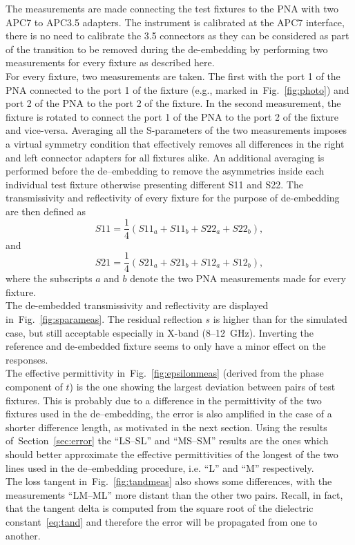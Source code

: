 \documentclass[11pt,a4paper]{article}
\newcommand{\sref}[1]{Section~\ref{#1}}
\newcommand{\fig}[1]{Fig.~\ref{#1}}
\newcommand{\laser}[1]{``#1''}
\begin{document}
    The measurements are made connecting the test fixtures to the PNA with two APC7 to APC3.5 adapters.
    The instrument is calibrated at the APC7 interface, there is no need to calibrate the 3.5 connectors as they can be
    considered as part of the transition to be removed during the de-embedding by performing two measurements for every
    fixture as described here.\\
    For every fixture, two measurements are taken.
    The first with the port 1 of the PNA connected to the port 1 of the fixture (e.g., marked in~\fig{fig:photo}) and
    port 2 of the PNA to the port 2 of the fixture.
    In the second measurement, the fixture is rotated to connect the port 1 of the PNA to the port 2 of the fixture and
    vice-versa.
    Averaging all the S-parameters of the two measurements imposes a virtual symmetry condition that effectively removes
    all differences in the right and left connector adapters for all fixtures alike.
    An additional averaging is performed before the de--embedding to remove the asymmetries inside each individual test
    fixture otherwise presenting different S11 and S22.
    The transmissivity and reflectivity of every fixture for the purpose of de-embedding are then defined as
    \begin{equation}
        S11 = \dfrac{1}{4}(S11_a + S11_b + S22_a + S22_b),
        \label{eq:saverage}
    \end{equation}
    and
    \begin{equation}
        S21 = \dfrac{1}{4}(S21_a + S21_b + S12_a + S12_b),
        \label{eq:taverage}
    \end{equation}
    where the subscripts $a$ and $b$ denote the two PNA measurements made for every fixture.\\
    The de-embedded transmissivity and reflectivity are displayed in~\fig{fig:sparameas}.
    The residual reflection $s$ is higher than for the simulated case, but still acceptable especially in X-band (8--12~GHz).
    Inverting the reference and de-embedded fixture seems to only have a minor effect on the responses.\\
    The effective permittivity in~\fig{fig:epsilonmeas} (derived from the phase component of $t$) is the one showing
    the largest deviation between pairs of test fixtures.
    This is probably due to a difference in the permittivity of the two fixtures used in the de--embedding, the error
    is also amplified in the case of a shorter difference length, as motivated in the next section.
    Using the results of~\sref{sec:error} the \laser{LS--SL} and \laser{MS--SM} results are the ones which should better
    approximate the effective permittivities of the longest of the two lines used in the de--embedding procedure, i.e.
    \laser{L} and \laser{M} respectively.\\
    The loss tangent in~\fig{fig:tandmeas} also shows some differences, with the measurements \laser{LM--ML} more distant
    than the other two pairs.
    Recall, in fact, that the tangent delta is computed from the square root of the dielectric constant~\eqref{eq:tand}
    and therefore the error will be propagated from one to another.
\end{document}
